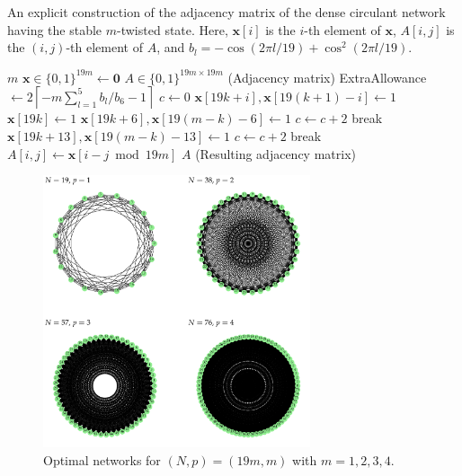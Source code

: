\begin{algorithm}[htbp]
    \caption{
        An explicit construction of the adjacency matrix of the dense circulant network having the stable $m$-twisted state.
        Here, $\bm{x}[i]$ is the $i$-th element of $\bm{x}$, $A[i,j]$ is the $(i,j)$-th element of $A$,
        and $b_{l}=-\cos(2\pi l/19)+\cos^{2}(2\pi l/19)$.
    }
    \label{alg1}
    \begin{algorithmic}[1]
    \Require $m$
    \State $\bm{x}\in\{0,1\}^{19m} \gets \bm{0}$
    \State $A\in\{0,1\}^{19m\times 19m}$ (Adjacency matrix)
    \State ExtraAllowance $\gets 2\left\lceil -m\sum_{l=1}^{5}b_{l}/b_{6}-1\right\rceil$
    \State $c \gets 0$
        \State $\bm{x}[19k+i],\bm{x}[19(k+1)-i] \gets 1$
        \EndFor
        \State $\bm{x}[19k] \gets 1$
        \EndIf
    \EndFor
    \State $\bm{x}[19k+6],\bm{x}[19(m-k)-6] \gets 1$
    \State $c \gets c+2$
        \State break
    \EndIf
    \State $\bm{x}[19k+13],\bm{x}[19(m-k)-13] \gets 1$
    \State $c \gets c+2$
        \State break
    \EndIf
    \EndFor
        \State $A[i,j] \gets \bm{x}[i-j \bmod 19m]$
    \EndFor
    \State \Return $A$ (Resulting adjacency matrix)
    \end{algorithmic}
\end{algorithm}

\begin{figure}[htbp]
    \centering
    \includegraphics[width=0.7\textwidth]{figs/19.pdf}
    \caption{Optimal networks for $(N,p)=(19m,m)$ with $m=1,2,3,4$.}
    \label{fig:19}
\end{figure}

